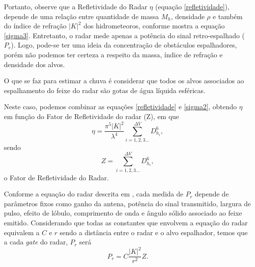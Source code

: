 Portanto, observe que a Refletividade do Radar $\eta$ (equação  \ref{refletividade}), depende  de uma relação entre quantidade de massa $M_h$, densidade $\rho$ e também do índice de refração $|K|^2$ dos hidrometeoros, conforme mostra a equação \ref{sigma3}. Entretanto, o radar mede apenas a potência do sinal retro-espalhado ($P_r$). Logo, pode-se ter uma ideia da concentração de obstáculos espalhadores, porém não podemos ter certeza a respeito da massa, índice de refração e densidade dos alvos. 


O que se faz para estimar a chuva é considerar que todos os alvos associados ao espalhamento do feixe do radar são gotas de água líquida esféricas. 

Neste caso, podemos combinar as equações \ref{refletividade} e \ref{sigma2}, obtendo $\eta$ em função do Fator de Refletividade  do radar (Z), em que 
\begin{equation}
\eta =  \dfrac{\pi^5 |K|^2  }{ \lambda^4 } \sum_{i=1, 2, 3 ... }^{\Delta V} D_{h_i}^6,
\end{equation}
sendo 
\begin{equation}
Z =  \sum_{i=1, 2, 3 ... }^{\Delta V}  D_{h_i}^6,
\label{fz}
\end{equation}
o Fator de Refletividade do Radar.

Conforme a equação do radar descrita em , cada medida de $P_r$ depende de parâmetros fixos como ganho da antena, potência do sinal transmitido, largura de pulso, efeito de lóbulo, comprimento de onda e ângulo sólido associado ao feixe emitido. Considerando que todas as constantes que envolvem a equação do radar equivalem a $C$ e $r$ sendo a distância entre o radar e o alvo espalhador, temos que a cada \textit{gate} do radar, $P_r$ será  
\begin{equation}
P_r = C \dfrac{|K|^2}{r^2}  Z .
\end{equation}

